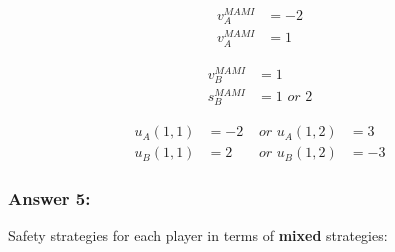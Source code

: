 \documentclass[11pt]{article}
\begin{document}
    \begin{minipage}{0.1\textwidth}
        \begin{align*}
            v_A^{MAMI} &= -2\\
            v_A^{MAMI} &= 1
        \end{align*}
    \end{minipage}
    \begin{minipage}{0.4\textwidth}
        \begin{align*}
            v_B^{MAMI} &= 1\\
            s_B^{MAMI} &= 1 \textit{ or } 2
        \end{align*}
    \end{minipage}
    \begin{minipage}{0.6\textwidth}
        \begin{align*}
            u_A(1, 1) &= -2 &\textit{   or   } u_A(1, 2) &= 3\\
            u_B(1, 1) &= 2  &\textit{   or   } u_B(1, 2) &= -3
        \end{align*}
    \end{minipage}

    \subsubsection{Answer 5:}

    Safety strategies for each player in terms of \textbf{mixed} strategies:
\end{document}
